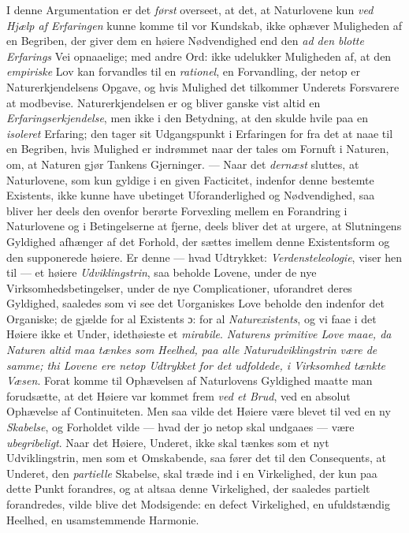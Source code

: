 \documentclass[12pt,a4paper]{book}
\newcommand{\opage}[1]{\marginnote{\footnotesize\textit{[#1]}}}
\begin{document}
I denne Argumentation er det \emph{først} overseet, at det, at Naturlovene kun \emph{ved Hjælp af Erfaringen} kunne komme til vor Kundskab, ikke ophæver Muligheden af en
Begriben, der giver dem en høiere Nødvendighed end den \emph{ad den blotte Erfarings} Vei opnaaelige; med andre Ord: ikke udelukker Muligheden af, at den \emph{empiriske} Lov kan forvandles til en \emph{rationel}, en Forvandling, der netop er Naturerkjendelsens Opgave, og
hvis Mulighed det tilkommer Underets Forsvarere at modbevise. Naturerkjendelsen er og
bliver ganske vist altid en \emph{Erfaringserkjendelse}, men ikke i den Betydning, at den
skulde hvile paa en \emph{isoleret} Erfaring; den tager sit Udgangspunkt i Erfaringen for
fra det at naae til en Begriben, hvis Mulighed er indrømmet naar der tales om Fornuft i
Naturen, om, at Naturen gjør Tankens Gjerninger. --- Naar det \emph{dernæst} sluttes, at
Naturlovene, som kun gyldige i en given Facticitet, indenfor denne bestemte Existents,
ikke kunne have ubetinget Uforanderlighed og Nødvendighed, saa bliver her \opage{84}deels den
ovenfor berørte Forvexling mellem en Forandring i Naturlovene og i Betingelserne at
fjerne, deels bliver det at urgere, at Slutningens Gyldighed afhænger af det Forhold, der
sættes imellem denne Existentsform og den supponerede høiere. Er denne --- hvad
Udtrykket: \emph{Verdensteleologie}, viser hen til --- et høiere \emph{Udviklingstrin},
saa beholde Lovene, under de nye Virksomhedsbetingelser, under de nye Complicationer,
uforandret deres Gyldighed, saaledes som vi see det Uorganiskes Love beholde den indenfor
det Organiske; de gjælde for al Existents ɔ: for al \emph{Naturexistents}, og vi faae i det
Høiere ikke et Under, idethøieste et \textit{mirabile}. \emph{Naturens primitive Love
maae, da Naturen altid maa tænkes som Heelhed, paa alle Naturudviklingstrin være de
samme; thi Lovene ere netop Udtrykket for det udfoldede, i Virksomhed tænkte Væsen}.
Forat komme til Ophævelsen af Naturlovens Gyldighed maatte man forudsætte, at det Høiere
var kommet frem \emph{ved et Brud}, ved en absolut Ophævelse af Continuiteten. Men saa vilde det
Høiere være blevet til ved en ny \emph{Skabelse}, og Forholdet vilde --- hvad der jo netop skal
undgaaes --- være \emph{ubegribeligt}. Naar det Høiere, Underet, ikke skal tænkes som et nyt
Udviklingstrin, men som et Omskabende, saa fører det til den Consequents, at Underet, den \emph{partielle} Skabelse, skal træde ind i en Virkelighed, der kun paa dette Punkt forandres,
og at altsaa denne Virkelighed, der saaledes partielt forandredes, vilde blive det
Modsigende: en defect Virkelighed, en ufuldstændig Heelhed, en usamstemmende Harmonie.
\end{document}
